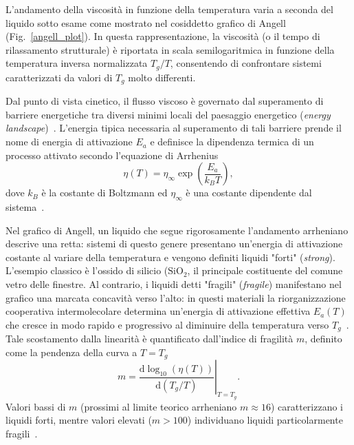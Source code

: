 \documentclass[../main.tex]{subfiles}
\begin{document}
	L'andamento della viscosità in funzione della temperatura varia a seconda del liquido sotto esame come mostrato nel cosiddetto grafico di Angell (Fig.~\ref{angell_plot}). In questa rappresentazione, la viscosità (o il tempo di rilassamento strutturale) è riportata in scala semilogaritmica in funzione della temperatura inversa normalizzata $T_g/T$, consentendo di confrontare sistemi caratterizzati da valori di $T_g$ molto differenti.
	
	Dal punto di vista cinetico, il flusso viscoso è governato dal superamento di barriere energetiche tra diversi minimi locali del paesaggio energetico (\textit{energy landscape})~\cite{debenedettiSupercooledLiquidsGlass2001}. L'energia tipica necessaria al superamento di tali barriere prende il nome di energia di attivazione $E_a$ e definisce la dipendenza termica di un processo attivato secondo l'equazione di Arrhenius
	\begin{equation}
		\eta(T) = \eta_\infty \exp\left( \frac{E_a}{k_B T} \right) ,
	\end{equation}
	dove $k_B$ è la costante di Boltzmann ed $\eta_\infty$ è una costante dipendente dal sistema~\cite{debenedettiSupercooledLiquidsGlass2001}.
	
	Nel grafico di Angell, un liquido che segue rigorosamente l'andamento arrheniano descrive una retta: sistemi di questo genere presentano un'energia di attivazione costante al variare della temperatura e vengono definiti liquidi "forti" (\textit{strong}). L'esempio classico è l'ossido di silicio ($\mathrm{SiO}_2$, il principale costituente del comune vetro delle finestre.
	Al contrario, i liquidi detti "fragili" (\textit{fragile}) manifestano nel grafico una marcata concavità verso l'alto: in questi materiali la riorganizzazione cooperativa intermolecolare determina un'energia di attivazione effettiva $E_a(T)$ che cresce in modo rapido e progressivo al diminuire della temperatura verso $T_g$~\cite{debenedettiSupercooledLiquidsGlass2001}. Tale scostamento dalla linearità è quantificato dall'indice di fragilità $m$, definito come la pendenza della curva a $T = T_g$
	\begin{equation}
		m = \left. \frac{\mathrm{d} \log_{10} (\eta(T))}{\mathrm{d}(T_g/T)} \right|_{T = T_g}.
	\end{equation}
	Valori bassi di $m$ (prossimi al limite teorico arrheniano $m \approx 16$) caratterizzano i liquidi forti, mentre valori elevati ($m > 100$) individuano liquidi particolarmente fragili~\cite{bohmerNonexponentialRelaxationsStrong1993}.
	
\end{document}
